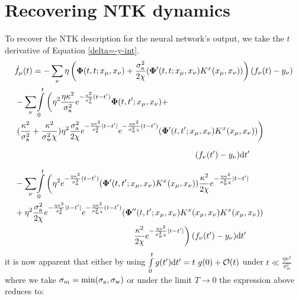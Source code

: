 \section{Recovering NTK dynamics}
To recover the NTK description for the neural network's output, we take the $t$ derivative of Equation \ref{delta=-y-int}.
 \begin{align}
       &\dot{f}_\mu(t)=-\sum\limits_{\nu}\eta\left( \bm{\Phi}(t,t;x_\mu,x_\nu)+\frac{\sigma_{\rm a}^2}{2\chi}(\bm{\Phi}'(t,t;x_\mu,x_\nu) K^x(x_\mu,x_\nu))\right) (f_\nu(t)-y_\nu)\notag\\ 
       & -\sum\limits_{\nu}\!\int\limits_0^t\left(
       {\eta^2}\frac{\eta\kappa^2}{\sigma_{\rm a}^2} e^{-\frac{\kappa^2}{\sigma_{\rm a}^2}(t-t')}\bm{\Phi}(t,t';x_\mu,x_\nu)+ \right.\notag\\
       &\left. (\frac{\kappa^2}{\sigma_{\rm a}^2}+\frac{\kappa^2}{\sigma_{\rm w}^2\chi}){\eta^2} \frac{\sigma_{\rm a}^2}{2\chi} e^{-\frac{\eta\kappa^2}{\sigma_{\rm a}^2}|t-t'|} e^{-\frac{\eta\kappa^2}{\sigma_{\rm w}^2\chi}(t-t')}(\bm{\Phi}'(t,t';x_\mu,x_\nu)  K^x(x_\mu,x_\nu))
       \right) \notag\\
       &\phantom{\left. (\frac{\kappa^2}{\sigma_{\rm a}^2}+\frac{\kappa^2}{\sigma_{\rm w}^2\chi}){\eta^2} \frac{\sigma_{\rm a}^2}{2\chi} e^{-\frac{\eta\kappa^2}{\sigma_{\rm a}^2}|t-t'|} e^{-\frac{\kappa^2}{\sigma_{\rm w}^2\chi}(t-t')}dsgoirhs\right)}(f_\nu(t')-y_\nu) \dif t'\notag\\
       &-\sum\limits_{\nu}\!\int\limits_0^t\left(
       {\eta^2} e^{-\frac{\eta\kappa^2}{\sigma_{\rm a}^2}(t-t')}(\bm{\Phi}'(t,t';x_\mu,x_\nu) K^x(x_\mu,x_\nu))\frac{\kappa^2}{2\chi} e^{-\frac{\eta\kappa^2}{\sigma_{\rm w}^2\chi}|t-t'|}
       \right.\notag\\
       &+{\eta^2}\frac{\sigma_{\rm a}^2}{2\chi}e^{-\frac{\eta\kappa^2}{\sigma_{\rm a}^2}|t-t'|}e^{-\frac{\eta\kappa^2}{\sigma_{\rm w}^2\chi}(t-t')}(\bm{\Phi}''(t,t';x_\mu,x_\nu) K^x(x_\mu,x_\nu) K^x(x_\mu,x_\nu))\notag\\
       &\phantom{+{\eta}\frac{\sigma_{\rm a}^2}{2\chi}e^{-\frac{\eta\kappa^2}{\sigma_{\rm a}^2}|t-t'|}e^{-\frac{\kappa^2}{\sigma_{\rm w}^2\chi}(t-t')}asga}\left.\frac{\kappa^2}{2\chi} e^{-\frac{\eta\kappa^2}{\sigma_{\rm w}^2\chi}|t-t'|}
       \right)(f_\nu(t')-y_\nu) \dif t' 
    \end{align}
it is now apparent that either by using $\int\limits_0^t g(t') \dif t'=t\ g(0)+\mathcal{O}(t)$ under $t\ll\frac{\eta\kappa^2}{\sigma_m^2}$ where we take $\sigma_m=\min(\sigma_{\rm a},\sigma_{\rm w})$ or under the limit $T\rightarrow0$ the expression above reduces to:
